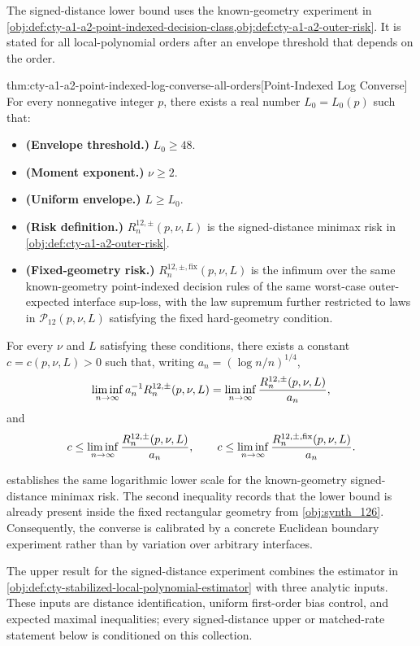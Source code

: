 \documentclass[11pt]{article}
\begin{document}
The signed-distance lower bound uses the known-geometry experiment in \cref{obj:def:cty-a1-a2-point-indexed-decision-class,obj:def:cty-a1-a2-outer-risk}. It is stated for all local-polynomial orders after an envelope threshold that depends on the order.

\begin{theoremv}{thm:cty-a1-a2-point-indexed-log-converse-all-orders}[Point-Indexed Log Converse]
For every nonnegative integer \(p\), there exists a real number \(L_0=L_0(p)\) such that:
\begin{itemize}
\item \textbf{(Envelope threshold.)} \(L_0\ge 48\).
\item \textbf{(Moment exponent.)} \(\nu\ge 2\).
\item \textbf{(Uniform envelope.)} \(L\ge L_0\).
\item \textbf{(Risk definition.)} \(R^{12,\pm}_n(p,\nu,L)\) is the signed-distance minimax risk in \cref{obj:def:cty-a1-a2-outer-risk}.
\item \textbf{(Fixed-geometry risk.)} \(R^{12,\pm,\mathrm{fix}}_n(p,\nu,L)\) is the infimum over the same known-geometry point-indexed decision rules of the same worst-case outer-expected interface sup-loss, with the law supremum further restricted to laws in \(\mathcal P_{12}(p,\nu,L)\) satisfying the fixed hard-geometry condition.
\end{itemize}
For every \(\nu\) and \(L\) satisfying these conditions, there exists a constant \(c=c(p,\nu,L)>0\) such that, writing \(a_n=(\log n/n)^{1/4}\),
\[
\liminf_{n\to\infty} a_n^{-1}R^{12,\pm}_n(p,\nu,L)
=
\liminf_{n\to\infty}{R^{12,\pm}_n(p,\nu,L)\over a_n},
\]
and
\[
c
\le
\liminf_{n\to\infty}{R^{12,\pm}_n(p,\nu,L)\over a_n},
\qquad
c
\le
\liminf_{n\to\infty}{R^{12,\pm,\mathrm{fix}}_n(p,\nu,L)\over a_n}.
\]
\end{theoremv}

 establishes the same logarithmic lower scale for the known-geometry signed-distance minimax risk. The second inequality records that the lower bound is already present inside the fixed rectangular geometry from \cref{obj:synth_126}. Consequently, the converse is calibrated by a concrete Euclidean boundary experiment rather than by variation over arbitrary interfaces.

The upper result for the signed-distance experiment combines the estimator in \cref{obj:def:cty-stabilized-local-polynomial-estimator} with three analytic inputs. These inputs are distance identification, uniform first-order bias control, and expected maximal inequalities; every signed-distance upper or matched-rate statement below is conditioned on this collection.
\end{document}
